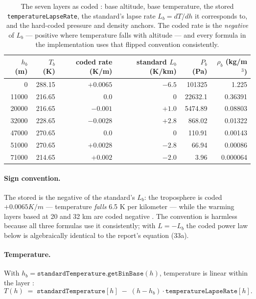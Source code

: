 \begin{table}[htbp]
\centering\small
\begin{tabular}{@{}rrrrrr@{}}
\toprule
$h_b$ (m) & $T_b$ (K) & coded rate (K/m) & standard $L_b$ (K/km) & $P_b$ (Pa) & $\rho_b$ (kg/m$^3$) \\
\midrule
0     & 288.15 & $+0.0065$ & $-6.5$ & 101325  & 1.225    \\
11000 & 216.65 & $0.0$     & $0$    & 22632.1 & 0.36391  \\
20000 & 216.65 & $-0.001$  & $+1.0$ & 5474.89 & 0.08803  \\
32000 & 228.65 & $-0.0028$ & $+2.8$ & 868.02  & 0.01322  \\
47000 & 270.65 & $0.0$     & $0$    & 110.91  & 0.00143  \\
51000 & 270.65 & $+0.0028$ & $-2.8$ & 66.94   & 0.00086  \\
71000 & 214.65 & $+0.002$  & $-2.0$ & 3.96    & 0.000064 \\
\bottomrule
\end{tabular}
\caption{The seven layers as coded : base altitude,
base temperature, the stored \texttt{temperatureLapseRate}, the standard's lapse rate
$L_b = dT/dh$ it corresponds to, and the hard-coded pressure and density anchors. The coded
rate is the \emph{negative} of $L_b$ --- positive where temperature falls with altitude ---
and every formula in the implementation uses that flipped convention
consistently.}\label{tab:environment-layers}
\end{table}

\paragraph{Sign convention.} The stored  is the negative of the
standard's $L_b$: the troposphere is coded $+0.0065\unit{K/m}$ --- temperature \emph{falls}
6.5 K per kilometer --- while the warming layers based at 20 and 32 km are coded negative
. The convention is harmless because all three
formulas use it consistently; with $L = -L_b$ the coded power law below is algebraically
identical to the report's equation (33a).

\paragraph{Temperature.} With $h_b = \mathtt{standardTemperature.getBinBase}(h)$, temperature
is linear within the layer :
\begin{equation}
T(h) \;=\; \mathtt{standardTemperature}[h] \;-\; (h - h_b)\cdot\mathtt{temperatureLapseRate}[h].
\label{eq:environment-temp}
\end{equation}

